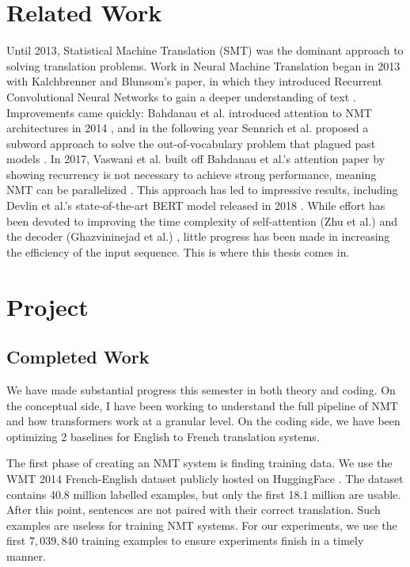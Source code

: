 \section{Related Work}
Until 2013, Statistical Machine Translation (SMT) was the dominant approach to solving translation problems. Work in Neural Machine Translation began in 2013 with Kalchbrenner and Blunsom’s paper, in which they introduced Recurrent Convolutional Neural Networks to gain a deeper understanding of text \cite{kalchbrenner-blunsom-2013-recurrent-convolutional}. Improvements came quickly: Bahdanau et al. introduced attention to NMT architectures in 2014 \cite{bahdanau2016neuralmachinetranslationjointly}, and in the following year Sennrich et al. proposed a subword approach to solve the out-of-vocabulary problem that plagued past models \cite{sennrich-etal-2016-neural}. In 2017, Vaswani et al. built off Bahdanau et al.’s attention paper by showing recurrency is not necessary to achieve strong performance, meaning NMT can be parallelized \cite{vaswani2023attentionneed}. This approach has led to impressive results, including Devlin et al.’s state-of-the-art BERT model released in 2018 \cite{devlin-etal-2019-bert}. While effort has been devoted to improving the time complexity of self-attention (Zhu et al.) \cite{zhu2021longshorttransformerefficienttransformers} and the decoder (Ghazvininejad et al.) \cite{ghazvininejad-etal-2019-mask}, little progress has been made in increasing the efficiency of the input sequence. This is where this thesis comes in.


\section{Project}

\subsection{Completed Work}
We have made substantial progress this semester in both theory and coding. On the conceptual side, I have been working to understand the full pipeline of NMT and how transformers work at a granular level. On the coding side, we have been optimizing 2 baselines for English to French translation systems. 

The first phase of creating an NMT system is finding training data. We use the WMT 2014 French-English dataset publicly hosted on HuggingFace \cite{bojar-etal-2014-findings}. The dataset contains 40.8 million labelled examples, but only the first 18.1 million are usable. After this point, sentences are not paired with their correct translation. Such examples are useless for training NMT systems. For our experiments, we use the first $7,039,840$ training examples to ensure experiments finish in a timely manner.

